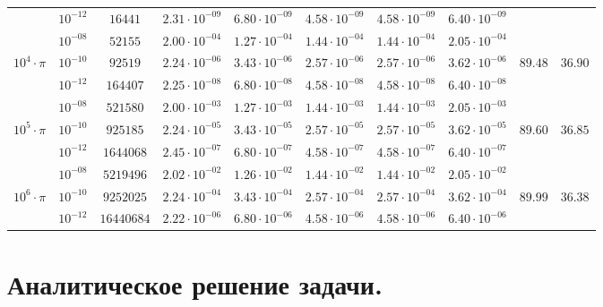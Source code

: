 \documentclass[a4paper,12pt]{article}
\begin{document}
\begin{table}[H]
\begin{tabular}{|c|c|c|c|c|c|c|c|c|c|}
    \cline{2-8}
    &$10^{-12}$&$ 16441$&$  2.31\cdot 10^{-09}$&$  6.80\cdot 10^{-09}$&$  4.58\cdot 10^{-09}$&$  4.58\cdot 10^{-09}$&$  6.40\cdot 10^{-09}$& &\\
    \cline{1-10}
    &$10^{-08}$&$ 52155$&$  2.00\cdot 10^{-04}$&$  1.27\cdot 10^{-04}$&$  1.44\cdot 10^{-04}$&$  1.44\cdot 10^{-04}$&$  2.05\cdot 10^{-04}$& &\\
    \cline{2-8}
    $10^4 \cdot \pi$&$10^{-10}$&$ 92519$&$  2.24\cdot 10^{-06}$&$  3.43\cdot 10^{-06}$&$  2.57\cdot 10^{-06}$&$  2.57\cdot 10^{-06}$&$  3.62\cdot 10^{-06}$&$89.48$&$36.90$\\
    \cline{2-8}
    &$10^{-12}$&$ 164407$&$  2.25\cdot 10^{-08}$&$  6.80\cdot 10^{-08}$&$  4.58\cdot 10^{-08}$&$  4.58\cdot 10^{-08}$&$  6.40\cdot 10^{-08}$& &\\
    \cline{1-10}
    &$10^{-08}$&$ 521580$&$  2.00\cdot 10^{-03}$&$  1.27\cdot 10^{-03}$&$  1.44\cdot 10^{-03}$&$  1.44\cdot 10^{-03}$&$  2.05\cdot 10^{-03}$& &\\
    \cline{2-8}
    $10^5 \cdot \pi$&$10^{-10}$&$ 925185$&$  2.24\cdot 10^{-05}$&$  3.43\cdot 10^{-05}$&$  2.57\cdot 10^{-05}$&$  2.57\cdot 10^{-05}$&$  3.62\cdot 10^{-05}$&$89.60$&$36.85$\\
    \cline{2-8}
    &$10^{-12}$&$ 1644068$&$  2.45\cdot 10^{-07}$&$  6.80\cdot 10^{-07}$&$  4.58\cdot 10^{-07}$&$  4.58\cdot 10^{-07}$&$  6.40\cdot 10^{-07}$& &\\
    \cline{1-10}
    &$10^{-08}$&$ 5219496$&$  2.02\cdot 10^{-02}$&$  1.26\cdot 10^{-02}$&$  1.44\cdot 10^{-02}$&$  1.44\cdot 10^{-02}$&$  2.05\cdot 10^{-02}$& &\\
    \cline{2-8}
    $10^6 \cdot \pi$&$10^{-10}$&$ 9252025$&$  2.24\cdot 10^{-04}$&$  3.43\cdot 10^{-04}$&$  2.57\cdot 10^{-04}$&$  2.57\cdot 10^{-04}$&$  3.62\cdot 10^{-04}$&$89.99$&$36.38$\\
    \cline{2-8}
    &$10^{-12}$&$ 16440684$&$  2.22\cdot 10^{-06}$&$  6.80\cdot 10^{-06}$&$  4.58\cdot 10^{-06}$&$  4.58\cdot 10^{-06}$&$  6.40\cdot 10^{-06}$& &\\
    \cline{1-10}
\end{tabular}
\end{table}

\newpage




\section{Аналитическое решение задачи.}
\end{document}
